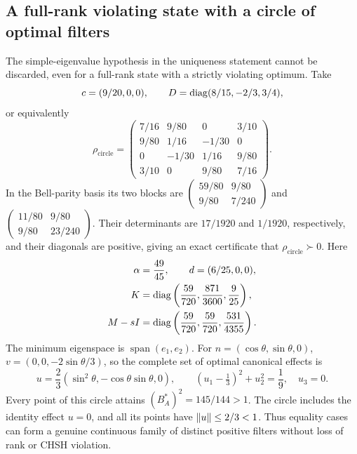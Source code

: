 \subsection{A full-rank violating state with a circle of optimal filters}

The simple-eigenvalue hypothesis in the uniqueness statement cannot be
discarded, even for a full-rank state with a strictly violating optimum.
Take
\[
 c=(9/20,0,0),\qquad D=\operatorname{diag}(8/15,-2/3,3/4),
\]
or equivalently
\begin{equation}
 \rho_{\mathrm{circle}}=
 \begin{pmatrix}
 7/16&9/80&0&3/10\\
 9/80&1/16&-1/30&0\\
 0&-1/30&1/16&9/80\\
 3/10&0&9/80&7/16
 \end{pmatrix}.
 \label{eq:ext-circle-state}
\end{equation}
In the Bell-parity basis its two blocks are
$\left(\begin{smallmatrix}59/80&9/80\\9/80&7/240\end{smallmatrix}\right)$
and
$\left(\begin{smallmatrix}11/80&9/80\\9/80&23/240\end{smallmatrix}\right)$.
Their determinants are $17/1920$ and $1/1920$, respectively, and
their diagonals are positive, giving an exact certificate that
$\rho_{\mathrm{circle}}\succ0$.
Here
\[
 \begin{aligned}
 \alpha&=\frac{49}{45},\qquad d=(6/25,0,0),\\
 K&=\operatorname{diag}\left(\frac{59}{720},\frac{871}{3600},\frac9{25}\right),\\
 M-sI&=\operatorname{diag}\left(\frac{59}{720},\frac{59}{720},\frac{531}{4355}\right).
 \end{aligned}
\]
The minimum eigenspace is $\operatorname{span}(e_1,e_2)$.
For $n=(\cos\theta,\sin\theta,0)$,
$v=(0,0,-2\sin\theta/3)$, so the complete set of optimal canonical
effects is
\begin{equation}
 u=\frac23(\sin^2\theta,-\cos\theta\sin\theta,0),
 \qquad
 (u_1-\tfrac13)^2+u_2^2=\frac19,\quad u_3=0.
 \label{eq:ext-optimal-circle}
\end{equation}
Every point of this circle attains
$(B_A^*)^2=145/144>1$.
The circle includes the identity effect $u=0$, and all its points
have $\left\lVert u\right\rVert\le2/3<1$. Thus equality cases can form a genuine
continuous family of distinct positive filters without loss of
rank or CHSH violation.
